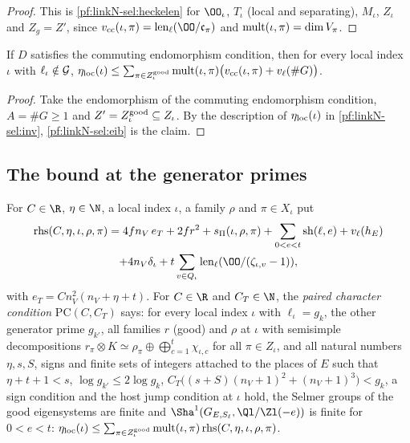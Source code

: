 \begin{proof}
This is \cref{pf:linkN-sel:heckelen} for $\OO_\iota$, $T_\iota$ (local and separating), $M_\iota$, $Z_\iota$ and $Z_g=Z'$, since
$\linkNselvcc(\iota,\pi)=\linkNsellen(\OO/\mathfrak c_\pi)$ and $\mathrm{mult}(\iota,\pi)=\dim V_\pi$.
\end{proof}

\begin{corollary}\label{pf:linkN-sel:pass}
If $D$ satisfies the commuting endomorphism condition, then for every local index $\iota$ with $\ell_\iota\notin\mathcal G$,
$\eta_{\mathrm{loc}}(\iota)\le\sum_{\pi\in Z^{\mathrm{good}}_\iota}\mathrm{mult}(\iota,\pi)\bigl(v_{\mathrm{cc}}(\iota,\pi)+v_\ell(\#G)\bigr)$.
\end{corollary}

\begin{proof}
Take the endomorphism of the commuting endomorphism condition, $A=\#G\ge1$ and $Z'=Z^{\mathrm{good}}_\iota\subseteq Z_\iota$. By the description
of $\eta_{\mathrm{loc}}(\iota)$ in \cref{pf:linkN-sel:inv}, \cref{pf:linkN-sel:eib} is the claim.
\end{proof}

\subsection{The bound at the generator primes}\label{sec:pf:linkN-sel:typ}

\begin{definition}\label{pf:linkN-sel:pcc}
For $C\in\R$, $\eta\in\N$, a local index $\iota$, a family $\rho$ and $\pi\in X_\iota$ put
\begin{multline*}
\mathrm{rhs}(C,\eta,\iota,\rho,\pi)=4fn_V\,e_T+2fr^2+\linkNselsP(\iota,\rho,\pi)+\sum_{0<e<t}\mathrm{sh}(\ell,e)+v_\ell(h_E)\\
+4n_V\delta_\iota+t\sum_{v\in Q_\iota}\linkNsellen(\OO/(\zeta_{\iota,v}-1)),
\end{multline*}
with $e_T=Cn_V^2(n_V+\eta+t)$. For $C\in\R$ and $C_T\in\N$, the \emph{paired character condition} $\mathrm{PC}(C,C_T)$ says: for every local
index $\iota$ with $\ell_\iota=g_k$, the other generator prime $g_{k'}$, all families $r$ (good) and $\rho$ at $\iota$ with semisimple
decompositions $r_\pi\otimes K\simeq\rho_\pi\oplus\bigoplus_{c=1}^t\chi_{\iota,c}$ for all $\pi\in Z_\iota$, and all natural numbers
$\eta,s,S$, signs and finite sets of integers attached to the places of $E$ such that $\eta+t+1<s$, $\log g_{k'}\le2\log g_k$,
$C_T\bigl((s+S)(n_V+1)^2+(n_V+1)^3\bigr)<g_k$, a sign condition and the host jump condition at $\iota$ hold, the Selmer groups of the
good eigensystems are finite and $\Sha^1(G_{E,S_\ell},\Ql/\Zl(-e))$ is finite for $0<e<t$:
$\eta_{\mathrm{loc}}(\iota)\le\sum_{\pi\in Z^{\mathrm{good}}_\iota}\mathrm{mult}(\iota,\pi)\,\mathrm{rhs}(C,\eta,\iota,\rho,\pi)$.
\end{definition}

